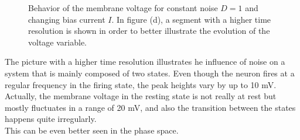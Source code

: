 \documentclass[12pt,a4paper]{article}
\begin{document}
\begin{figure}[H]
	\caption{Behavior of the membrane voltage for constant noise $D=1$ and changing bias current $I$. In figure (d), a segment with a higher time resolution is shown in order to better illustrate the evolution of the voltage variable.}
	\label{currentnoise} 
\end{figure}
The picture with a higher time resolution illustrates he influence of noise on a system that is mainly composed of two states. Even though the neuron fires at a regular frequency in the firing state, the peak heights vary by up to 10 mV. Actually, the membrane voltage in the resting state is not really at rest but mostly fluctuates in a range of 20 mV, and also the transition between the states happens quite irregularly.\\
This can be even better seen in the phase space.
\end{document}
